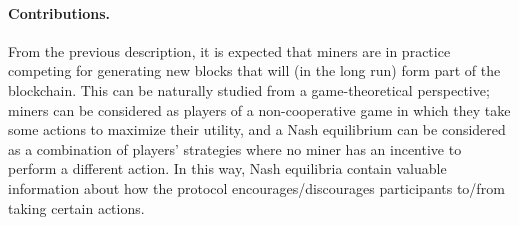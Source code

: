 \paragraph*{\bf Contributions.}  From the previous description, it is expected that miners are in practice competing for generating new blocks that will (in the long run) form part of the blockchain. This can be naturally studied from a game-theoretical perspective; miners can be considered as players of a non-cooperative game in which they take some actions to maximize their utility, and a Nash equilibrium can be considered as a combination of players' strategies where no miner has an incentive to perform a different action. In this way, Nash equilibria contain valuable information about how the protocol encourages/discourages participants to/from taking certain actions.
 
